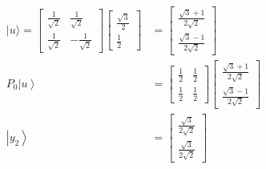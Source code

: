 \documentclass[main.tex]{subfiles}
\begin{document}
\begin{enumerate}
\begin{enumerate}
\begin{align*}
            |u\rangle =
            \left[\begin{array}{cc} \frac{1}{\sqrt{2}} & \frac{1}{\sqrt{2}} 
            \\ \frac{1}{\sqrt{2}} & -\frac{1}{\sqrt{2}} \end{array}\right]
            \left[\begin{array}{c} \frac{\sqrt{3}}{2} 
            \\ \frac{1}{2} \end{array}\right]                                           & = \left[\begin{array}{c} \frac{\sqrt{3}+1}{2 \sqrt{2}} \\ \frac{\sqrt{3}-1}{2 \sqrt{2}} \end{array}\right] \tag{new basis}\\
            P_{0} \left|u\right\rangle                                                & = \left[\begin{array}{ll} \frac{1}{2} & \frac{1}{2} \\ \frac{1}{2} & \frac{1}{2} \end{array}\right] 
                                                                                        \left[\begin{array}{c} \frac{\sqrt{3}+1}{2 \sqrt{2}} \\ \frac{\sqrt{3}-1}{2 \sqrt{2}} \end{array}\right] \\
            \left|y_{2}\right\rangle                                                    & = \left[\begin{array}{c} \frac{\sqrt{3}}{2\sqrt{2}} \\ \frac{\sqrt{3}}{2\sqrt{2}} \end{array}\right]
        \end{align*}
        

\end{enumerate}
\end{enumerate}
\end{document}
